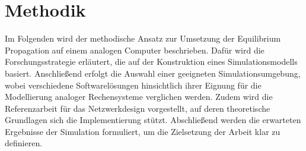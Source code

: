 \newpage

\section{Methodik}

Im Folgenden wird der methodische Ansatz zur Umsetzung der Equilibrium Propagation auf einem analogen Computer beschrieben. Dafür wird die Forschungsstrategie erläutert, die auf der Konstruktion eines Simulationsmodells basiert. Anschließend erfolgt die Auswahl einer geeigneten Simulationsumgebung, wobei verschiedene Softwarelösungen hinsichtlich ihrer Eignung für die Modellierung analoger Rechensysteme verglichen werden. Zudem wird die Referenzarbeit für das Netzwerkdesign vorgestellt, auf deren theoretische Grundlagen sich die Implementierung stützt. Abschließend werden die erwarteten Ergebnisse der Simulation formuliert, um die Zielsetzung der Arbeit klar zu definieren.





